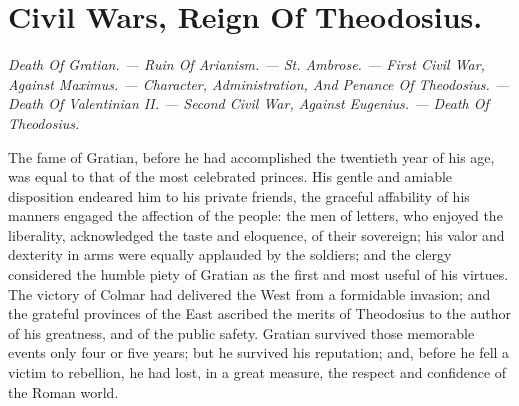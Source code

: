 \chapter{Civil Wars, Reign Of Theodosius.}

\textit{Death Of Gratian. — Ruin Of Arianism. — St. Ambrose. — First Civil War,
Against Maximus. — Character, Administration, And Penance Of
Theodosius. — Death Of Valentinian II. — Second Civil War, Against
Eugenius. — Death Of Theodosius.}

The fame of Gratian, before he had accomplished the twentieth
year of his age, was equal to that of the most celebrated
princes. His gentle and amiable disposition endeared him to his
private friends, the graceful affability of his manners engaged
the affection of the people: the men of letters, who enjoyed the
liberality, acknowledged the taste and eloquence, of their
sovereign; his valor and dexterity in arms were equally applauded
by the soldiers; and the clergy considered the humble piety of
Gratian as the first and most useful of his virtues. The victory
of Colmar had delivered the West from a formidable invasion; and
the grateful provinces of the East ascribed the merits of
Theodosius to the author of his greatness, and of the public
safety. Gratian survived those memorable events only four or five
years; but he survived his reputation; and, before he fell a
victim to rebellion, he had lost, in a great measure, the respect
and confidence of the Roman world.

